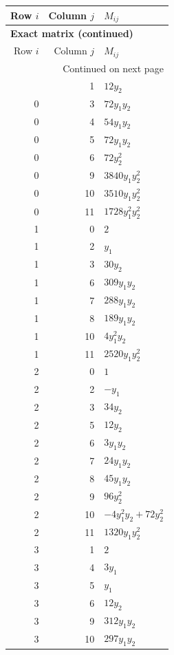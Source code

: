 \documentclass[10pt,a4paper]{article}
\begin{document}
{\small\setlength{\tabcolsep}{7pt}\begin{longtable}{rrp{125mm}}
\toprule Row $i$ & Column $j$ & $M_{ij}$\\\midrule\endfirsthead
\multicolumn{3}{l}{\textbf{Exact matrix (continued)}}\\
\toprule Row $i$ & Column $j$ & $M_{ij}$\\\midrule\endhead
\midrule\multicolumn{3}{r}{Continued on next page}\\\endfoot\bottomrule\endlastfoot
0 & 1 & $12 y_{2}$\\
0 & 3 & $72 y_{1} y_{2}$\\
0 & 4 & $54 y_{1} y_{2}$\\
0 & 5 & $72 y_{1} y_{2}$\\
0 & 6 & $72 y_{2}^{2}$\\
0 & 9 & $3840 y_{1} y_{2}^{2}$\\
0 & 10 & $3510 y_{1} y_{2}^{2}$\\
0 & 11 & $1728 y_{1}^{2} y_{2}^{2}$\\
1 & 0 & $2$\\
1 & 2 & $y_{1}$\\
1 & 3 & $30 y_{2}$\\
1 & 6 & $309 y_{1} y_{2}$\\
1 & 7 & $288 y_{1} y_{2}$\\
1 & 8 & $189 y_{1} y_{2}$\\
1 & 10 & $4 y_{1}^{2} y_{2}$\\
1 & 11 & $2520 y_{1} y_{2}^{2}$\\
2 & 0 & $1$\\
2 & 2 & $- y_{1}$\\
2 & 3 & $34 y_{2}$\\
2 & 5 & $12 y_{2}$\\
2 & 6 & $3 y_{1} y_{2}$\\
2 & 7 & $24 y_{1} y_{2}$\\
2 & 8 & $45 y_{1} y_{2}$\\
2 & 9 & $96 y_{2}^{2}$\\
2 & 10 & $- 4 y_{1}^{2} y_{2} + 72 y_{2}^{2}$\\
2 & 11 & $1320 y_{1} y_{2}^{2}$\\
3 & 1 & $2$\\
3 & 4 & $3 y_{1}$\\
3 & 5 & $y_{1}$\\
3 & 6 & $12 y_{2}$\\
3 & 9 & $312 y_{1} y_{2}$\\
3 & 10 & $297 y_{1} y_{2}$\\

\end{longtable}}
\end{document}
